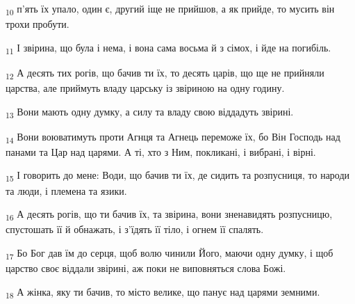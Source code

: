 \begin{tcolorbox}
\textsubscript{10} п'ять їх упало, один є, другий іще не прийшов, а як прийде, то мусить він трохи пробути.
\end{tcolorbox}
\begin{tcolorbox}
\textsubscript{11} І звірина, що була і нема, і вона сама восьма й з сімох, і йде на погибіль.
\end{tcolorbox}
\begin{tcolorbox}
\textsubscript{12} А десять тих рогів, що бачив ти їх, то десять царів, що ще не прийняли царства, але приймуть владу царську із звіриною на одну годину.
\end{tcolorbox}
\begin{tcolorbox}
\textsubscript{13} Вони мають одну думку, а силу та владу свою віддадуть звірині.
\end{tcolorbox}
\begin{tcolorbox}
\textsubscript{14} Вони воюватимуть проти Агнця та Агнець переможе їх, бо Він Господь над панами та Цар над царями. А ті, хто з Ним, покликані, і вибрані, і вірні.
\end{tcolorbox}
\begin{tcolorbox}
\textsubscript{15} І говорить до мене: Води, що бачив ти їх, де сидить та розпусниця, то народи та люди, і племена та язики.
\end{tcolorbox}
\begin{tcolorbox}
\textsubscript{16} А десять рогів, що ти бачив їх, та звірина, вони зненавидять розпусницю, спустошать її й обнажать, і з'їдять її тіло, і огнем її спалять.
\end{tcolorbox}
\begin{tcolorbox}
\textsubscript{17} Бо Бог дав їм до серця, щоб волю чинили Його, маючи одну думку, і щоб царство своє віддали звірині, аж поки не виповняться слова Божі.
\end{tcolorbox}
\begin{tcolorbox}
\textsubscript{18} А жінка, яку ти бачив, то місто велике, що панує над царями земними.
\end{tcolorbox}

